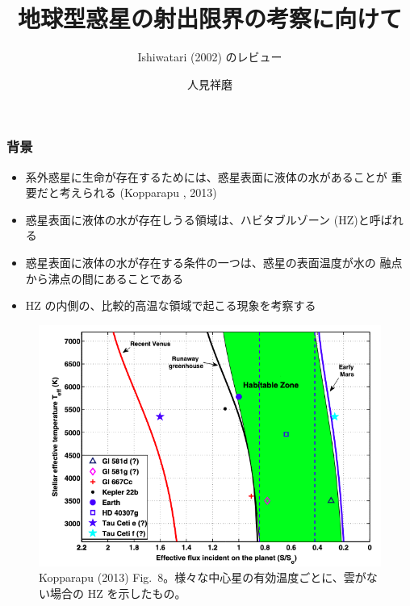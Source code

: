 \documentclass[aspectratio=149,9pt,fleqn]{beamer}
\institute{北海道大学大学院理学院 地球流体力学研究室 M2}
\author{人見祥磨}
\title{地球型惑星の射出限界の考察に向けて}
\subtitle{Ishiwatari \etal (2002) のレビュー}
\begin{document}
\maketitle

\begin{frame}
	\frametitle{背景}
	\begin{itemize}
		\item 系外惑星に生命が存在するためには、惑星表面に液体の水があることが
			重要だと考えられる (Kopparapu \etal*, 2013)
		\item 惑星表面に液体の水が存在しうる領域は、ハビタブルゾーン (HZ)と呼ばれる
		\item 惑星表面に液体の水が存在する条件の一つは、惑星の表面温度が水の
			融点から沸点の間にあることである
		\item HZ の内側の、比較的高温な領域で起こる現象を考察する
	\end{itemize}
	\begin{figure}
		\centering\scriptsize
		\includegraphics[width=.5\textwidth]{kopparapu8.png}\\
		Kopparapu \etal (2013) Fig.\ 8。様々な中心星の有効温度ごとに、雲がない場合の HZ を示したもの。
	\end{figure}
\end{frame}
\end{document}
